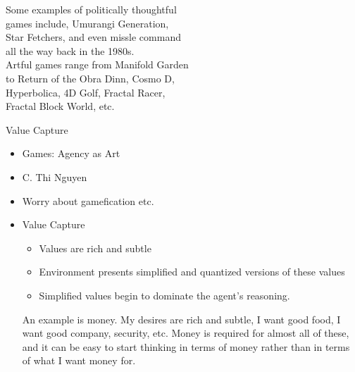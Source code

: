 \documentclass{report}
\begin{document}
\begin{description}
\begin{mdframed}
\begin{itemize}
\begin{center}
{                            Some examples of politically thoughtful\\
                            games include, Umurangi Generation,\\
                            Star Fetchers, and even missle command\\
                            all the way back in the 1980s.\\
                            Artful games range from Manifold Garden\\
                            to Return of the Obra Dinn, Cosmo D,\\
                            Hyperbolica, 4D Golf, Fractal Racer,\\
                            Fractal Block World, etc.
                        }
                    \end{center}
            \end{itemize}
        \end{mdframed}
    \item Value Capture
        \begin{mdframed}
            \begin{itemize}
                \item Games: Agency as Art
                \item C. Thi Nguyen
                \item Worry about gamefication etc.
                \item Value Capture
                    \begin{itemize}
                        \item Values are rich and subtle
                        \item Environment presents simplified and
                            quantized versions of these values
                        \item Simplified values begin to dominate
                            the agent's reasoning.
                    \end{itemize}
                    \begin{mdframed}
                        An example is money. My desires are rich
                        and subtle, I want good food, I want good
                        company, security, etc. Money is required
                        for almost all of these, and it can be easy
                        to start thinking in terms of money rather
                        than in terms of what I want money for.

\end{mdframed}
\end{itemize}
\end{mdframed}
\end{description}
\end{document}
